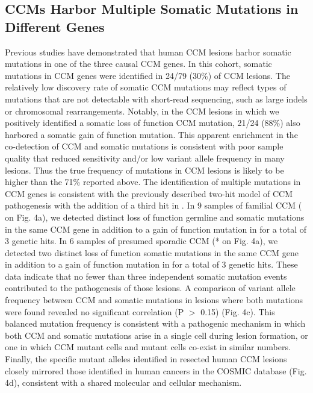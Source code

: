 \subsection{CCMs Harbor Multiple Somatic Mutations in Different Genes}
Previous studies have demonstrated that human CCM lesions harbor somatic mutations in one of the three causal CCM genes. In this cohort, somatic mutations in CCM genes were identified in 24/79 (30\%) of CCM lesions. The relatively low discovery rate of somatic CCM mutations may reflect types of mutations that are not detectable with short-read sequencing, such as large indels or chromosomal rearrangements. Notably, in the CCM lesions in which we positively identified a somatic loss of function CCM mutation, 21/24 (88\%) also harbored a somatic gain of function  mutation. This apparent enrichment in the co-detection of CCM and  somatic mutations is consistent with poor sample quality that reduced sensitivity and/or low variant allele frequency in many lesions. Thus the true frequency of  mutations in CCM lesions is likely to be higher than the 71\% reported above. The identification of multiple mutations in CCM genes is consistent with the previously described two-hit model of CCM pathogenesis with the addition of a third hit in .  In 9 samples of familial CCM (\ddag ~ on Fig. 4a), we detected distinct loss of function germline and somatic mutations in the same CCM gene in addition to a gain of function mutation in  for a total of 3 genetic hits. In 6 samples of presumed sporadic CCM (*  on Fig. 4a), we detected two distinct loss of function somatic mutations in the same CCM gene in addition to a gain of function mutation in  for a total of 3 genetic hits. These data indicate that no fewer than three independent somatic mutation events contributed to the pathogenesis of those lesions. A comparison of variant allele frequency between CCM and  somatic mutations in lesions where both mutations were found revealed no significant correlation (P $>$ 0.15) (Fig. 4c). This balanced mutation frequency is consistent with a pathogenic mechanism in which both CCM and  somatic mutations arise in a single cell during lesion formation, or one in which CCM mutant cells and  mutant cells co-exist in similar numbers. Finally, the specific mutant  alleles identified in resected human CCM lesions closely mirrored those identified in human cancers in the COSMIC database (Fig. 4d), consistent with a shared molecular and cellular mechanism. 

